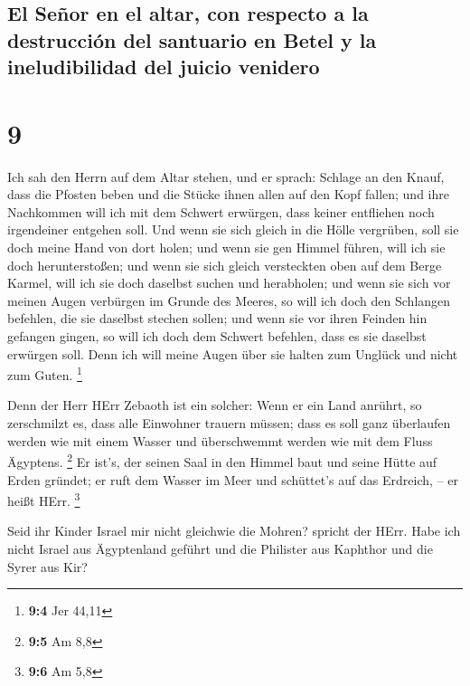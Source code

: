\hypertarget{el-seuxf1or-en-el-altar-con-respecto-a-la-destrucciuxf3n-del-santuario-en-betel-y-la-ineludibilidad-del-juicio-venidero}{%
\subsection{El Señor en el altar, con respecto a la destrucción del
santuario en Betel y la ineludibilidad del juicio
venidero}\label{el-seuxf1or-en-el-altar-con-respecto-a-la-destrucciuxf3n-del-santuario-en-betel-y-la-ineludibilidad-del-juicio-venidero}}

\hypertarget{section-8}{%
\section{9}\label{section-8}}

 Ich sah den Herrn auf dem Altar stehen, und er sprach:
Schlage an den Knauf, dass die Pfosten beben und die Stücke ihnen allen
auf den Kopf fallen; und ihre Nachkommen will ich mit dem Schwert
erwürgen, dass keiner entfliehen noch irgendeiner entgehen soll.
 Und wenn sie sich gleich in die Hölle vergrüben, soll sie
doch meine Hand von dort holen; und wenn sie gen Himmel führen, will ich
sie doch herunterstoßen;  und wenn sie sich gleich
versteckten oben auf dem Berge Karmel, will ich sie doch daselbst suchen
und herabholen; und wenn sie sich vor meinen Augen verbürgen im Grunde
des Meeres, so will ich doch den Schlangen befehlen, die sie daselbst
stechen sollen;  und wenn sie vor ihren Feinden hin
gefangen gingen, so will ich doch dem Schwert befehlen, dass es sie
daselbst erwürgen soll. Denn ich will meine Augen über sie halten zum
Unglück und nicht zum Guten. \footnote{\textbf{9:4} Jer 44,11}

 Denn der Herr HErr Zebaoth ist ein solcher: Wenn er ein
Land anrührt, so zerschmilzt es, dass alle Einwohner trauern müssen;
dass es soll ganz überlaufen werden wie mit einem Wasser und
überschwemmt werden wie mit dem Fluss Ägyptens. \footnote{\textbf{9:5}
  Am 8,8}  Er ist's, der seinen Saal in den Himmel baut
und seine Hütte auf Erden gründet; er ruft dem Wasser im Meer und
schüttet's auf das Erdreich, -- er heißt HErr. \footnote{\textbf{9:6} Am
  5,8}

 Seid ihr Kinder Israel mir nicht gleichwie die Mohren?
spricht der HErr. Habe ich nicht Israel aus Ägyptenland geführt und die
Philister aus Kaphthor und die Syrer aus Kir?

